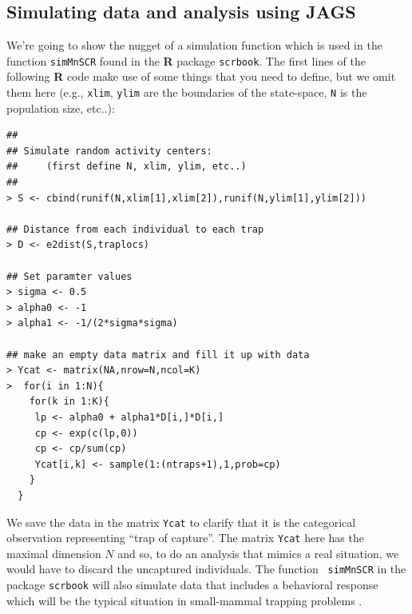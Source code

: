 \subsection{Simulating data and analysis using JAGS}

We're going to show the nugget of a simulation function which is
used in the function \mbox{\tt simMnSCR} found in the {\bf R} package
\mbox{\tt scrbook}.  The first lines of the following {\bf R} code
make use of some things that you need to define, but we omit them here
(e.g., \mbox{\tt xlim}, \mbox{\tt ylim} are the boundaries of the
state-space, \mbox{\tt N} is the population size, etc..):
{\small
\begin{verbatim}
##
## Simulate random activity centers:
##     (first define N, xlim, ylim, etc..)
##
> S <- cbind(runif(N,xlim[1],xlim[2]),runif(N,ylim[1],ylim[2]))

## Distance from each individual to each trap
> D <- e2dist(S,traplocs)

## Set paramter values
> sigma <- 0.5
> alpha0 <- -1
> alpha1 <- -1/(2*sigma*sigma)

## make an empty data matrix and fill it up with data
> Ycat <- matrix(NA,nrow=N,ncol=K)
>  for(i in 1:N){
    for(k in 1:K){
     lp <- alpha0 + alpha1*D[i,]*D[i,]
     cp <- exp(c(lp,0))
     cp <- cp/sum(cp)
     Ycat[i,k] <- sample(1:(ntraps+1),1,prob=cp)
    }
  }
\end{verbatim}
}
We save the data in the matrix \mbox{\tt Ycat} to clarify that it is
the categorical observation representing ``trap of capture''. 
The matrix \mbox{\tt Ycat} here  has the maximal dimension $N$
and so, to do an  analysis that  mimics a real situation, we would have to
discard the uncaptured individuals.  The function \mbox{\tt
  simMnSCR} in the package \mbox{\tt scrbook} will also simulate
data that includes a behavioral response
 which will be the
typical situation in small-mammal trapping problems
\citep[see][for details]{converse_royle:2012}.

